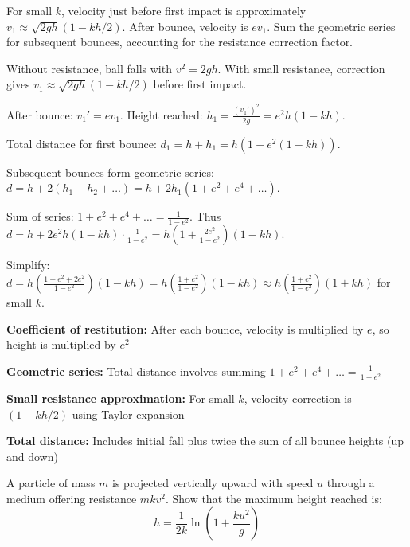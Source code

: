 \begin{hint}
For small $k$, velocity just before first impact is approximately $v_1 \approx \sqrt{2gh}(1 - kh/2)$. After bounce, velocity is $ev_1$. Sum the geometric series for subsequent bounces, accounting for the resistance correction factor.
\end{hint}

\begin{solution}
Without resistance, ball falls with $v^2 = 2gh$. With small resistance, correction gives $v_1 \approx \sqrt{2gh}(1 - kh/2)$ before first impact.

After bounce: $v_1' = ev_1$. Height reached: $h_1 = \frac{(v_1')^2}{2g} = e^2h(1 - kh)$.

Total distance for first bounce: $d_1 = h + h_1 = h(1 + e^2(1 - kh))$.

Subsequent bounces form geometric series: $d = h + 2(h_1 + h_2 + \ldots) = h + 2h_1(1 + e^2 + e^4 + \ldots)$.

Sum of series: $1 + e^2 + e^4 + \ldots = \frac{1}{1 - e^2}$. Thus $d = h + 2e^2h(1 - kh) \cdot \frac{1}{1 - e^2} = h\left(1 + \frac{2e^2}{1 - e^2}\right)(1 - kh)$.

Simplify: $d = h\left(\frac{1 - e^2 + 2e^2}{1 - e^2}\right)(1 - kh) = h\left(\frac{1 + e^2}{1 - e^2}\right)(1 - kh) \approx h\left(\frac{1 + e^2}{1 - e^2}\right)(1 + kh)$ for small $k$.
\end{solution}

\begin{takeaways}
\item \textbf{Coefficient of restitution:} After each bounce, velocity is multiplied by $e$, so height is multiplied by $e^2$
\item \textbf{Geometric series:} Total distance involves summing $1 + e^2 + e^4 + \ldots = \frac{1}{1-e^2}$
\item \textbf{Small resistance approximation:} For small $k$, velocity correction is $(1 - kh/2)$ using Taylor expansion
\item \textbf{Total distance:} Includes initial fall plus twice the sum of all bounce heights (up and down)
\end{takeaways}

\begin{problem}
A particle of mass $m$ is projected vertically upward with speed $u$ through a medium offering resistance $mkv^2$. Show that the maximum height reached is:
\[
h = \frac{1}{2k}\ln\left(1 + \frac{ku^2}{g}\right)
\]
\end{problem}

